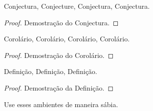 \begin{con}
  Conjectura, Conjecture, Conjectura, Conjectura.
\end{con}
\begin{proof}
  Demostração do Conjectura.
\end{proof}

\begin{cor}
  Corolário, Corolário, Corolário, Corolário.
\end{cor}
\begin{proof}
  Demostração do Corolário.
\end{proof}

\begin{dfn}
  Definição, Definição, Definição.
\end{dfn}
\begin{proof}
  Demostração da Definição.
\end{proof}

Use esses ambientes de maneira sábia.